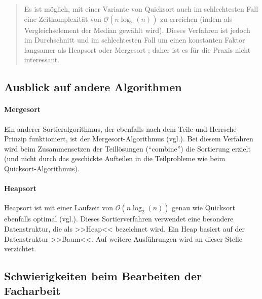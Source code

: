 \documentclass[11pt, a4paper, oneside, openright]{article}
\newcommand \vgl{vgl.\xspace }
\newcommand \Kap{Kap.\xspace }
\begin{document}
\begin{quote}
Es ist möglich, mit einer Variante von Quicksort auch im schlechtesten Fall eine Zeitkomplexität von $\mathcal{O}\left(n\log_2{(n)}\right)$  zu erreichen (indem als Vergleichselement der Median gewählt wird). Dieses Verfahren ist jedoch im Durchschnitt und im schlechtesten Fall um einen konstanten Faktor langsamer als Heapsort oder Mergesort \textins{\vgl\Kap\ref{sec:ausblick}}; daher ist es für die Praxis nicht interessant.

\hfill\cite{uniflensburgQS}
\end{quote}





\subsection{Ausblick auf andere Algorithmen}
\label{sec:ausblick}

\paragraph{Mergesort}
Ein anderer Sortieralgorithmus, der ebenfalls nach dem Teile-und-Herrsche-Prinzip funktioniert, ist der Mergesort-Algorithmus (\vgl \cite{wikiSortierverfahren}). Bei diesem Verfahren wird beim Zusammensetzen der Teillösungen (\enquote{combine}) die Sortierung erzielt (und nicht durch das geschickte Aufteilen in die Teilprobleme wie beim Quicksort-Algorithmus). 

\paragraph{Heapsort}
Heapsort ist mit einer Laufzeit von $\mathcal{O}\left(n\log_2{(n)}\right)$ genau wie Quicksort ebenfalls optimal (\vgl \cite{wikiSortierverfahren}). Dieses Sortierverfahren verwendet eine besondere Datenstruktur, die als >>Heap<< bezeichnet wird. Ein Heap basiert auf der Datenstruktur >>Baum<<. Auf weitere Ausführungen wird an dieser Stelle verzichtet.





\subsection{Schwierigkeiten beim Bearbeiten der Facharbeit}
\lipsum[3]{}
\end{document}
